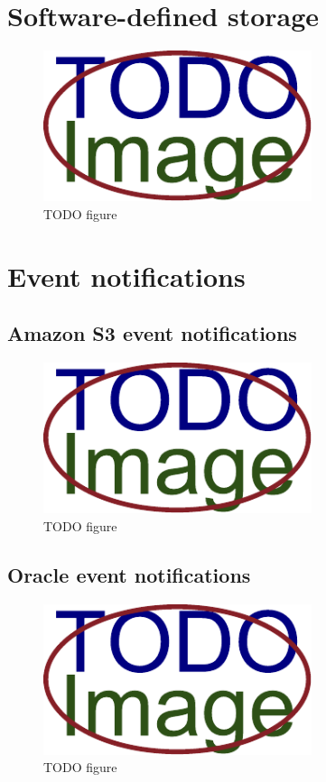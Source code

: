 \section{Software-defined storage}
    \textcolor{gray}{\Blindtext}
    \begin{figure}[hbt]
        \centering
        \includegraphics[width=0.7\textwidth]{obrazky-figures/placeholder.pdf}
        \caption{TODO figure}
    \end{figure}

\section{Event notifications}
    \textcolor{gray}{\Blindtext}
\subsection{Amazon S3 event notifications}
    \textcolor{gray}{\Blindtext}
    \begin{figure}[hbt]
        \centering
        \includegraphics[width=0.7\textwidth]{obrazky-figures/placeholder.pdf}
        \caption{TODO figure}
    \end{figure}
\subsection{Oracle event notifications}
    \textcolor{gray}{\Blindtext}
    \begin{figure}[hbt]
        \centering
        \includegraphics[width=0.7\textwidth]{obrazky-figures/placeholder.pdf}
        \caption{TODO figure}
    \end{figure}

